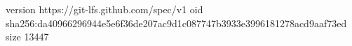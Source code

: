 version https://git-lfs.github.com/spec/v1
oid sha256:da40966296944e5e6f36de207ac9d1c087747b3933e3996181278acd9aaf73ed
size 13447

